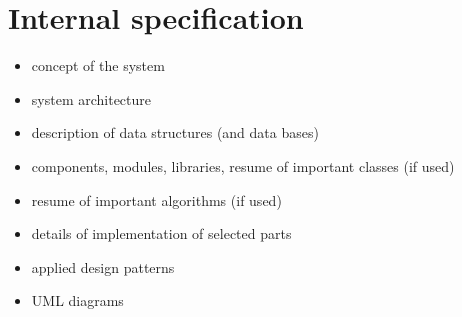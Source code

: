 \documentclass[a4paper,twoside,12pt]{book}
\begin{document}
%
%
%
%
%        
 
\chapter{Internal specification}

\begin{itemize}
\item concept of the system
\item system architecture
\item description of data structures (and data bases)
\item components, modules, libraries, resume of important classes (if used)
\item resume of important algorithms (if used)
\item details of implementation of selected parts
\item applied design patterns
\item UML diagrams
\end{itemize}
\end{document}
